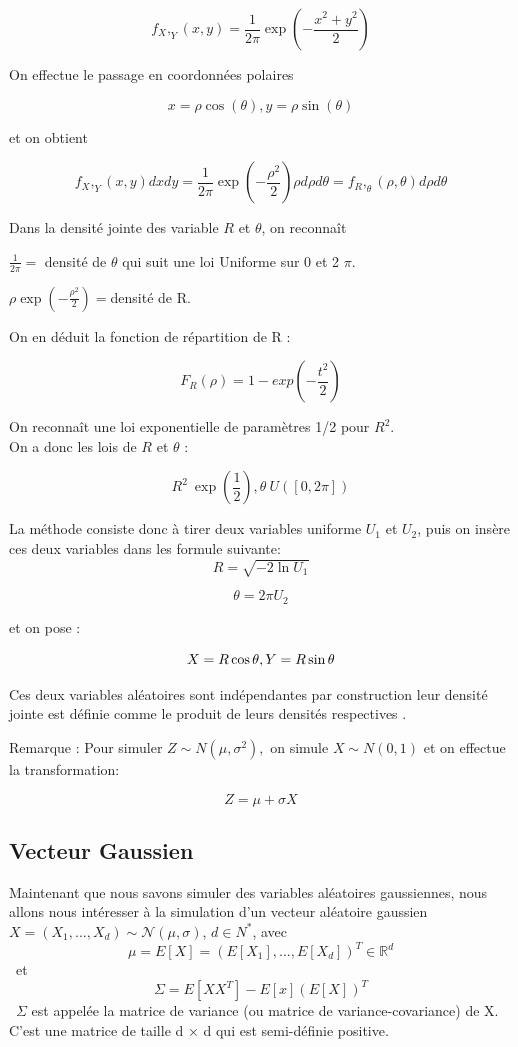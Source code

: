 \documentclass[10pt]{article} %
\begin{document}
$$f_X,_Y(x,y) = \frac{1}{2\pi}\exp(-\frac {x^2+y^2}{2})$$

On effectue le passage en coordonnées polaires

$$x = \rho \cos(\theta), y = \rho \sin(\theta)$$

et on obtient

$$f_X,_Y(x,y)dxdy = \frac {1}{2\pi}\exp(-\frac {\rho^2}{2})\rho d\rho d\theta = f_R,_\theta(\rho,\theta)d\rho d\theta$$

Dans la densité jointe des variable $R$ et $\theta$, on reconnaît

$\frac{1}{2\pi} =$ densité de $\theta$ qui suit une loi Uniforme sur 0 et 2 $\pi$.


$\rho \exp(-\frac{\rho^2}{2}) = $densité de R.

On en déduit la fonction de répartition de R :

$$F_R(\rho) = 1- exp(-\frac{t^2}{2})$$

On reconnaît une loi exponentielle de paramètres 1/2 pour $R^2$.\\
On a donc les lois de $R$ et  $\theta$ :

$$R^2 ~ \exp(\frac{1}{2}), \theta ~ U([0, 2\pi])$$

La méthode consiste donc à tirer deux variables uniforme $U_1$ et $U_2$, puis on insère ces deux variables dans les formule suivante: \\

$$R = \sqrt{-2 \ln U_1}$$

$$\theta = 2\pi U_2$$

et on pose :

$$X = R\cos\theta, \\
Y = R\sin\theta$$

Ces deux variables aléatoires sont indépendantes par construction leur densité jointe est définie comme le produit de leurs densités respectives .

Remarque : Pour simuler $Z \sim N (\mu, \sigma^2 ),$ on simule $X \sim N (0, 1)$ et on effectue la transformation:

 $$Z = \mu + \sigma X$$

 \subsection{Vecteur Gaussien}
 Maintenant que nous savons simuler des variables aléatoires gaussiennes, nous allons nous intéresser à la simulation d’un
 vecteur aléatoire gaussien $X = (X_1, ... ,X_d) \sim \mathcal{N}(\mu , \sigma)$,  $d \in  N^*$, avec \
            $$ \mu = E[X] = (E[X_1], ... ,E[X_d])^T \in \mathbb{R}^d $$ \
     et \
             $$\Sigma = E[XX^T] - E[x](E[X])^T $$ \
 $\Sigma$ est appelée la matrice de variance (ou matrice de variance-covariance) de X. C’est une matrice de taille d × d qui est semi-définie positive.
\end{document}
